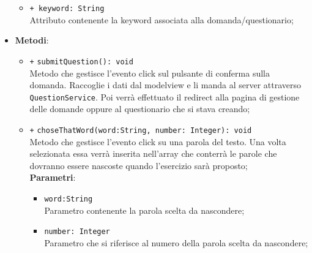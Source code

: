 \begin{itemize}
\begin{itemize}
		\item \texttt{+ keyword: String} \\ Attributo contenente la keyword associata alla domanda/questionario;
	\end{itemize}
	\item \textbf{Metodi}:
	\begin{itemize}
			\item \texttt{+} \texttt{submitQuestion(): void}\\ 
			Metodo che gestisce l’evento click sul pulsante di conferma sulla domanda. Raccoglie i dati dal modelview e li manda al server attraverso \texttt{QuestionService}. Poi verrà effettuato il redirect alla pagina di gestione delle domande oppure al questionario che si stava creando; 
			\item \texttt{+} \texttt{choseThatWord(word:String, number: Integer): void}\\
			Metodo che gestisce l’evento click su una parola del testo. Una volta selezionata essa verrà inserita nell'array che conterrà le parole che dovranno essere nascoste quando l'esercizio sarà proposto; \\
			\textbf{Parametri}:
			\begin{itemize}
				\item \texttt{word:String} \\
				Parametro contenente la parola scelta da nascondere;
				\item \texttt{number: Integer} \\ 
				Parametro che si riferisce al numero della parola scelta da nascondere;
			\end{itemize}
	\end{itemize}
\end{itemize}

